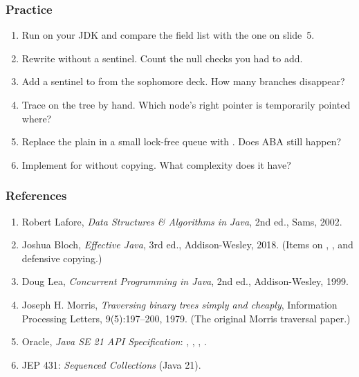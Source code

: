 \documentclass[aspectratio=169,10pt,compress]{beamer}
\begin{document}
\begin{frame}[t,fragile] \frametitle{Practice}
  \begin{enumerate}\small
    \item Run  on your JDK and
          compare the field list with the one on slide~5.
    \item Rewrite  without a sentinel. Count the
          null checks you had to add.
    \item Add a sentinel to  from the sophomore
          deck. How many branches disappear?
    \item Trace  on the tree
           by hand. Which node's right pointer is
          temporarily pointed where?
    \item Replace the plain  in a small
          lock-free queue with . Does
          ABA still happen?
    \item Implement  for 
          without copying. What complexity does it have?
  \end{enumerate}
\end{frame}




\begin{frame}[t,fragile] \frametitle{References}
  \begin{enumerate}\small
    \item Robert Lafore, \emph{Data Structures \& Algorithms in Java},
          2nd ed., Sams, 2002.
    \item Joshua Bloch, \emph{Effective Java}, 3rd ed.,
          Addison-Wesley, 2018. (Items on ,
          , and defensive copying.)
    \item Doug Lea, \emph{Concurrent Programming in Java},
          2nd ed., Addison-Wesley, 1999.
    \item Joseph H. Morris, \emph{Traversing binary trees simply and
          cheaply}, Information Processing Letters, 9(5):197--200, 1979.
          (The original Morris traversal paper.)
    \item Oracle, \emph{Java SE 21 API Specification}:
          ,
          ,
          ,
          .
    \item JEP 431: \emph{Sequenced Collections} (Java 21).
  \end{enumerate}
\end{frame}




\begin{frame}[t,fragile]
  \begin{center}
    \vspace{4cm}
  \end{center}
\end{frame}
\end{document}
